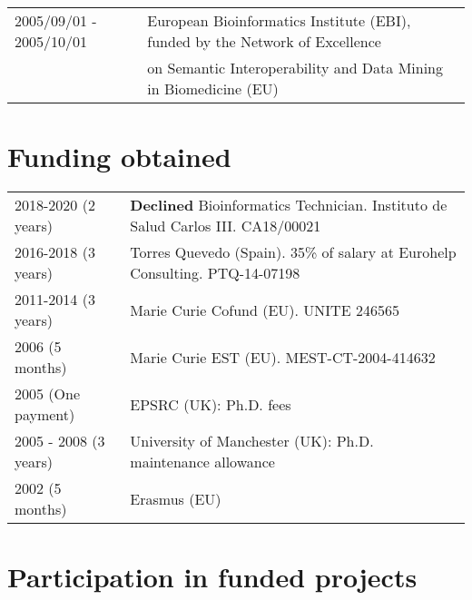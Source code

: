 \documentclass[11pt,fullpage]{article}
\begin{document}
\begin{tabular}{ll}
 2005/09/01 - 2005/10/01 & European Bioinformatics Institute (EBI), funded by the Network of Excellence \\
      & on Semantic Interoperability and Data Mining in Biomedicine (EU)

\end{tabular}

\section*{Funding obtained}

\begin{tabular}{ll}
  2018-2020 (2 years) & {\bf Declined} Bioinformatics Technician. Instituto de Salud Carlos III. CA18/00021 \\
  2016-2018 (3 years) & Torres Quevedo (Spain). 35\% of salary at Eurohelp Consulting. PTQ-14-07198 \\
	2011-2014 (3 years) & Marie Curie Cofund (EU). UNITE 246565 \\
	2006 (5 months) & Marie Curie EST (EU). MEST-CT-2004-414632 \\
	2005 (One payment) & EPSRC (UK): Ph.D. fees \\
	2005 - 2008 (3 years) & University of Manchester (UK): Ph.D. maintenance allowance \\
	2002 (5 months) & Erasmus (EU) \\
\end{tabular}

\section*{Participation in funded projects}
\end{document}
